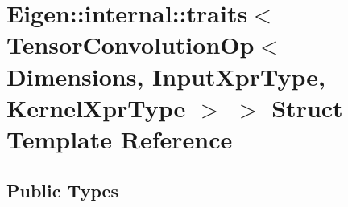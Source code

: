 \hypertarget{struct_eigen_1_1internal_1_1traits_3_01_tensor_convolution_op_3_01_dimensions_00_01_input_xpr_tyede4d3ebe1b8839795edc93275eed3f9}{}\section{Eigen\+:\+:internal\+:\+:traits$<$ Tensor\+Convolution\+Op$<$ Dimensions, Input\+Xpr\+Type, Kernel\+Xpr\+Type $>$ $>$ Struct Template Reference}
\label{struct_eigen_1_1internal_1_1traits_3_01_tensor_convolution_op_3_01_dimensions_00_01_input_xpr_tyede4d3ebe1b8839795edc93275eed3f9}
\subsection*{Public Types}
